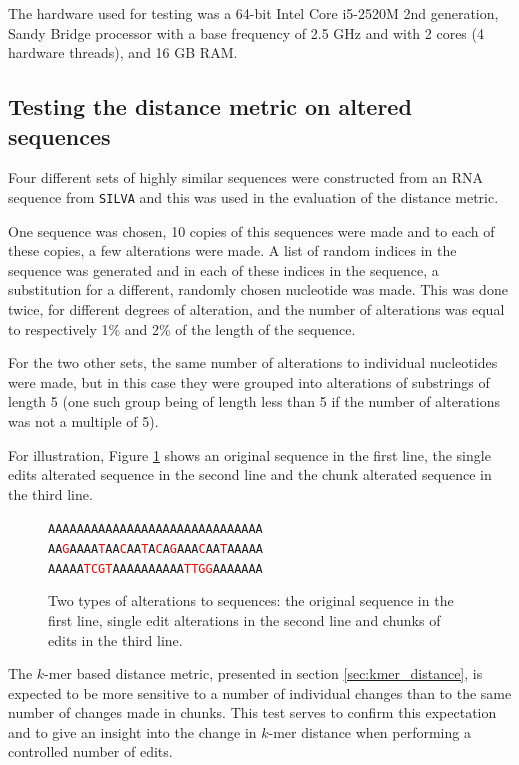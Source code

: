 The hardware used for testing was a 64-bit Intel Core i5-2520M 2nd generation,
Sandy Bridge processor with a base frequency of 2.5 GHz and with 2 cores (4
hardware threads), and 16 GB RAM.


\subsection{Testing the distance metric on altered sequences}
\label{sec:altered_sequences}

Four different sets of highly similar sequences were constructed from an RNA
sequence from \texttt{SILVA} and this was used in the evaluation of the
distance metric.

One sequence was chosen, 10 copies of this sequences were made and to each of
these copies, a few alterations were made. A list of random indices in the
sequence was generated and in each of these indices in the sequence, a
substitution for a different, randomly chosen nucleotide was made.  This was
done twice, for different degrees of alteration, and the number of alterations
was equal to respectively 1\% and 2\% of the length of the sequence.

For the two other sets, the same number of alterations to individual
nucleotides were made, but in this case they were grouped into alterations of
substrings of length 5 (one such group being of length less than 5 if the
number of alterations was not a multiple of 5).

For illustration, Figure \ref{fig:alterations} shows an original sequence in
the first line, the single edits alterated sequence in the second line and the
chunk alterated sequence in the third line.

\newcommand{\tc}[1]{\textcolor{red}{#1}}
\begin{figure}[H]
  \centering
  \texttt{AAAAAAAAAAAAAAAAAAAAAAAAAAAAAA} \\
  \texttt{AA\tc{G}AAAA\tc{T}AA\tc{C}AA\tc{T}A\tc{C}A\tc{G}AAA\tc{C}AA\tc{T}AAAAA} \\
  \texttt{AAAAA\tc{TCGT}AAAAAAAAAA\tc{TTGG}AAAAAAA}
  \caption{Two types of alterations to sequences: the original sequence in the
    first line, single edit alterations in the second line and chunks of edits
    in the third line.}
  \label{fig:alterations}
\end{figure}

The $k$-mer based distance metric, presented in section
\ref{sec:kmer_distance}, is expected to be more sensitive to a number of
individual changes than to the same number of changes made in chunks. This test
serves to confirm this expectation and to give an insight into the change in
$k$-mer distance when performing a controlled number of edits.

